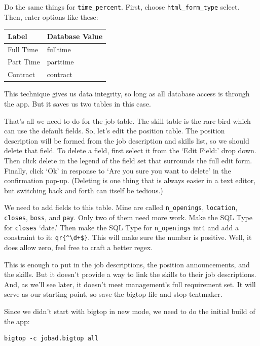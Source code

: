 Do the same things for \verb+time_percent+.  First, choose
\verb+html_form_type+ select.  Then, enter options like these:

\begin{tabular}{l|l}
Label               & Database Value    \\
\hline
Full Time           & fulltime          \\
Part Time           & parttime          \\
Contract            & contract          \\
\end{tabular}

This technique gives us data integrity, so long as all database access
is through the app.  But it saves us two tables in this case.

That's all we need to do for the job table.  The skill table is the rare
bird which can use the default fields.  So, let's edit the position
table.  The position description will be formed from the job description
and skills list, so we should delete that field.  To delete a field,
first select it from the `Edit Field:' drop down.  Then click delete
in the legend of the field set that surrounds the full edit form.
Finally, click `Ok' in response to `Are you sure you want to delete' in
the confirmation pop-up.  (Deleting is one thing that is always easier
in a text editor, but switching back and forth can itself be tedious.)

We need to add fields to this table.  Mine are called \verb+n_openings+,
\verb+location+, \verb+closes+, \verb+boss+, and \verb+pay+.  Only two
of them need more work.  Make the SQL Type for \verb+closes+ `date.'
Then make the SQL Type for \verb+n_openings+ int4 and add a constraint to
it: \verb_qr{^\d+$}_.  This will make sure the number is positive.  Well,
it does allow zero, feel free to craft a better regex.

This is enough to put in the job descriptions, the position announcements,
and the skills.  But it doesn't provide a way to link the skills to their
job descriptions.  And, as we'll see later, it doesn't meet management's
full requirement set.  It will serve as our starting point, so save the
bigtop file and stop tentmaker.

Since we didn't start with bigtop in new mode, we need to do the initial
build of the app:

\begin{verbatim}
bigtop -c jobad.bigtop all
\end{verbatim}


